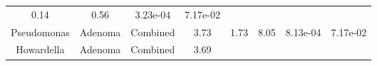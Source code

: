 \documentclass[12pt,]{article}
\begin{document}
\begin{longtable}[]{@{}cccccccc@{}}
\begin{minipage}[t]{0.13\columnwidth}
0.14\strut
\end{minipage} & \begin{minipage}[t]{0.13\columnwidth}\centering\strut
0.56\strut
\end{minipage} & \begin{minipage}[t]{0.07\columnwidth}\centering\strut
3.23e-04\strut
\end{minipage} & \begin{minipage}[t]{0.07\columnwidth}\centering\strut
7.17e-02\strut
\end{minipage}\tabularnewline
\begin{minipage}[t]{0.16\columnwidth}\centering\strut
Pseudomonas\strut
\end{minipage} & \begin{minipage}[t]{0.08\columnwidth}\centering\strut
Adenoma\strut
\end{minipage} & \begin{minipage}[t]{0.09\columnwidth}\centering\strut
Combined\strut
\end{minipage} & \begin{minipage}[t]{0.05\columnwidth}\centering\strut
3.73\strut
\end{minipage} & \begin{minipage}[t]{0.13\columnwidth}\centering\strut
1.73\strut
\end{minipage} & \begin{minipage}[t]{0.13\columnwidth}\centering\strut
8.05\strut
\end{minipage} & \begin{minipage}[t]{0.07\columnwidth}\centering\strut
8.13e-04\strut
\end{minipage} & \begin{minipage}[t]{0.07\columnwidth}\centering\strut
7.17e-02\strut
\end{minipage}\tabularnewline
\begin{minipage}[t]{0.16\columnwidth}\centering\strut
Howardella\strut
\end{minipage} & \begin{minipage}[t]{0.08\columnwidth}\centering\strut
Adenoma\strut
\end{minipage} & \begin{minipage}[t]{0.09\columnwidth}\centering\strut
Combined\strut
\end{minipage} & \begin{minipage}[t]{0.05\columnwidth}\centering\strut
3.69\strut
\end{minipage} & \begin{minipage}[t]{0.13\columnwidth}\centering\strut

\end{minipage}
\end{longtable}
\end{document}
